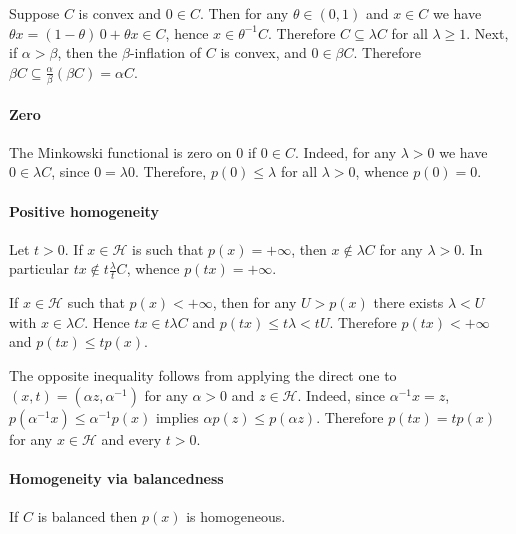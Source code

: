 \documentclass[a4paper]{article}
\newcommand{\Hcal}{\mathcal{H}}
\begin{document}
Suppose $C$ is convex and $0\in C$. Then for any $\theta \in (0, 1)$ and $x\in C$
we have $\theta x = (1 - \theta)\, 0 + \theta x \in C$, hence $x \in \theta^{-1} C$.
Therefore $C \subseteq \lambda C$ for all $\lambda \geq 1$. Next, if $\alpha > \beta$,
then the $\beta$-inflation of $C$ is convex, and $0 \in \beta C$. Therefore $\beta C
\subseteq \tfrac\alpha\beta (\beta C) = \alpha C$.


\paragraph{Zero} %
\label{par:zero}

The Minkowski functional is zero on $0$ if $0\in C$. Indeed, for any $\lambda > 0$
we have $0 \in \lambda C$, since $0 = \lambda 0$. Therefore, $p(0) \leq \lambda$
for all $\lambda > 0$, whence $p(0) = 0$.


\paragraph{Positive homogeneity} %
\label{par:pos_homogeneity}

Let $t > 0$. If $x\in\Hcal$ is such that $p(x) = +\infty$, then $x\notin \lambda C$
for any $\lambda>0$. In particular $t x\notin t \tfrac\lambda{t} C$, whence $p(tx)
= +\infty$.

If $x \in \Hcal$ such that $p(x) < +\infty$, then for any $U > p(x)$ there exists
$\lambda < U$ with $x\in \lambda C$. Hence $t x \in t \lambda C$ and $p(t x) \leq
t \lambda < t U$. Therefore $p(t x) < +\infty$ and $p(t x) \leq t p(x)$.

The opposite inequality follows from applying the direct one to $(x, t) = (\alpha
z, \alpha^{-1})$ for any $\alpha > 0$ and $z \in \Hcal$. Indeed, since $\alpha^{-1}
x = z$, $p(\alpha^{-1} x) \leq \alpha^{-1} p(x)$ implies $\alpha p(z) \leq p(\alpha z)$.
Therefore $p(t x) = t p(x)$ for any $x \in \Hcal$ and every $t > 0$.


\paragraph{Homogeneity via balancedness} %
\label{par:homogeneity_via_balancedness}

If $C$ is balanced then $p(x)$ is homogeneous.
\end{document}
